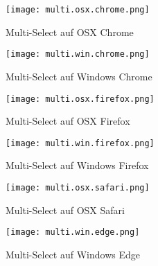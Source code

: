 
\begin{figure}[!htb]
    \centering
    \begin{minipage}[b]{0.45\textwidth}
        \centering
        \texttt{[image: multi.osx.chrome.png]}
        \caption{Multi-Select auf OSX Chrome}
        \label{img:multiOsxChromeSelect}
    \end{minipage}
    \hfill
    \begin{minipage}[b]{0.45\textwidth}
        \centering
        \texttt{[image: multi.win.chrome.png]}
        \caption{Multi-Select auf Windows Chrome}
        \label{img:multiWinChromeSelect}
    \end{minipage}
\end{figure}

\begin{figure}[!htb]
    \centering
    \begin{minipage}[b]{0.45\textwidth}
        \centering
        \texttt{[image: multi.osx.firefox.png]}
        \caption{Multi-Select auf OSX Firefox}
        \label{img:multiOsxFirefoxSelect}
    \end{minipage}
    \hfill
    \begin{minipage}[b]{0.45\textwidth}
        \centering
        \texttt{[image: multi.win.firefox.png]}
        \caption{Multi-Select auf Windows Firefox}
        \label{img:multiWinFirefoxSelect}
    \end{minipage}
\end{figure}

\begin{figure}[!htb]
    \centering
    \begin{minipage}[b]{0.45\textwidth}
        \centering
        \texttt{[image: multi.osx.safari.png]}
        \caption{Multi-Select auf OSX Safari}
        \label{img:multiOsxSafariSelect}
    \end{minipage}
    \hfill
    \begin{minipage}[b]{0.45\textwidth}
        \centering
        \texttt{[image: multi.win.edge.png]}
        \caption{Multi-Select auf Windows Edge}
        \label{img:multiWinEdgeSelect}
    \end{minipage}
\end{figure}


